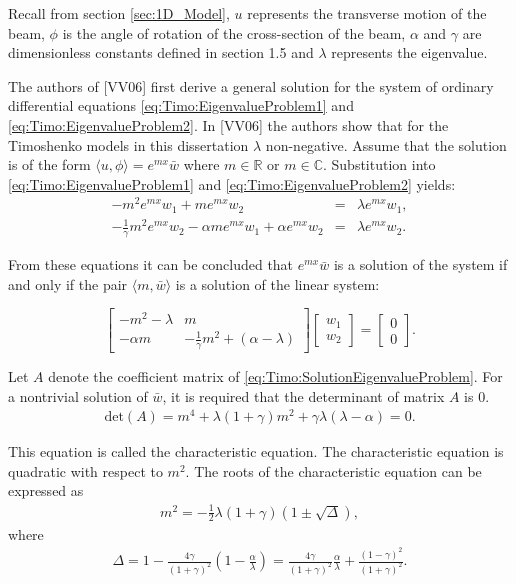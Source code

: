 \documentclass[../../main.tex]{subfiles}
\begin{document}
Recall from section \ref{sec:1D_Model}, $u$ represents the transverse motion of the beam, $\phi$ is the angle of rotation of the cross-section of the beam, $\alpha$ and $\gamma$ are dimensionless constants defined in section 1.5 and $\lambda$ represents the eigenvalue. 

The authors of [VV06] first derive a general solution for the system of ordinary differential equations \eqref{eq:Timo:EigenvalueProblem1} and \eqref{eq:Timo:EigenvalueProblem2}. In [VV06] the authors show that for the Timoshenko models in this dissertation $\lambda$ non-negative. Assume that the solution is of the form $\langle u, \phi \rangle = e^{mx}\bar{w}$ where $m\in \mathbb{R}$ or $m\in \mathbb{C}$. Substitution into \eqref{eq:Timo:EigenvalueProblem1} and \eqref{eq:Timo:EigenvalueProblem2} yields:
\begin{eqnarray*}
-m^{2}e^{mx}w_{1}+me^{mx}w_{2}&=&\lambda e^{mx}w_{1},\\
-\frac{1}{\gamma}m^{2}e^{mx}w_{2}-\alpha me^{mx}w_{1}+\alpha e^{mx}w_{2}&=&\lambda e^{mx}w_{2}.
\end{eqnarray*}


From these equations it can be concluded that $e^{mx}\bar{w}$ is a solution of the system if and only if the pair $\langle m,\bar{w} \rangle$ is a solution of the linear system:

\begin{equation}
\begin{bmatrix}
-m^{2}-\lambda & m\\
-\alpha m & -\frac{1}{\gamma}m^{2}+(\alpha- \lambda)
\end{bmatrix}
\begin{bmatrix}
w_{1}\\w_{2}
\end{bmatrix}
=
\begin{bmatrix}
0\\0
\end{bmatrix}. \label{eq:Timo:SolutionEigenvalueProblem}
\end{equation}

Let $A$ denote the coefficient matrix of \eqref{eq:Timo:SolutionEigenvalueProblem}. For a nontrivial solution of $\bar{w}$, it is required that the determinant of matrix $A$ is $0$.
\begin{align*}
\textrm{det}(A)=m^{4}+\lambda(1+\gamma)m^{2}+\gamma\lambda(\lambda-\alpha)=0. \label{TE7}
\end{align*}

This equation is called the characteristic equation. The characteristic equation is quadratic with respect to $m^2$. The roots of the characteristic equation can be expressed as
\begin{align}
m^{2}=-\frac{1}{2}\lambda(1+\gamma)(1\pm\sqrt{\Delta}),
\end{align}
where
\begin{align}
\Delta=1-\frac{4\gamma}{(1+\gamma)^{2}}\left(1-\frac{\alpha}{\lambda}\right)=\frac{4\gamma}{(1+\gamma)^{2}}\frac{\alpha}{\lambda}+\frac{(1-\gamma)^{2}}{(1+\gamma)^{2}}.
\end{align}
\end{document}
